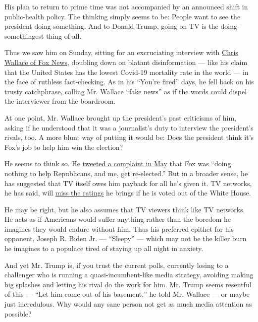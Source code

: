 His plan to return to prime time was not accompanied by an announced
shift in public-health policy. The thinking simply seems to be: People
want to see the president doing something. And to Donald Trump, going on
TV is the doing-somethingest thing of all.

Thus we saw him on Sunday, sitting for an excruciating interview with
\href{https://www.nytimes3xbfgragh.onion/2020/07/19/us/politics/trump-fox-interview-coronavirus-race.html}{Chris
Wallace of Fox News}, doubling down on blatant disinformation --- like
his claim that the United States has the lowest Covid-19 mortality rate
in the world --- in the face of ruthless fact-checking. As in his
``You're fired'' days, he fell back on his trusty catchphrase, calling
Mr. Wallace ``fake news'' as if the words could dispel the interviewer
from the boardroom.

At one point, Mr. Wallace brought up the president's past criticisms of
him, asking if he understood that it was a journalist's duty to
interview the president's rivals, too. A more blunt way of putting it
would be: Does the president think it's Fox's job to help him win the
election?

He seems to think so. He
\href{https://twitter.com/realDonaldTrump/status/1263537553073942528}{tweeted
a complaint in May} that Fox was ``doing nothing to help Republicans,
and me, get re-elected.'' But in a broader sense, he has suggested that
TV itself owes him payback for all he's given it. TV networks, he has
said, will
\href{https://www.hollywoodreporter.com/news/donald-trump-says-media-needs-him-win-election-1070632}{miss
the ratings} he brings if he is voted out of the White House.

He may be right, but he also assumes that TV viewers think like TV
networks. He acts as if Americans would suffer anything rather than the
boredom he imagines they would endure without him. Thus his preferred
epithet for his opponent, Joseph R. Biden Jr. --- ``Sleepy'' --- which
may not be the killer burn he imagines to a populace tired of staying up
all night in anxiety.

And yet Mr. Trump is, if you trust the current polls, currently losing
to a challenger who is running a quasi-incumbent-like media strategy,
avoiding making big splashes and letting his rival do the work for him.
Mr. Trump seems resentful of this --- ``Let him come out of his
basement,'' he told Mr. Wallace --- or maybe just incredulous. Why would
any sane person not get as much media attention as possible?


